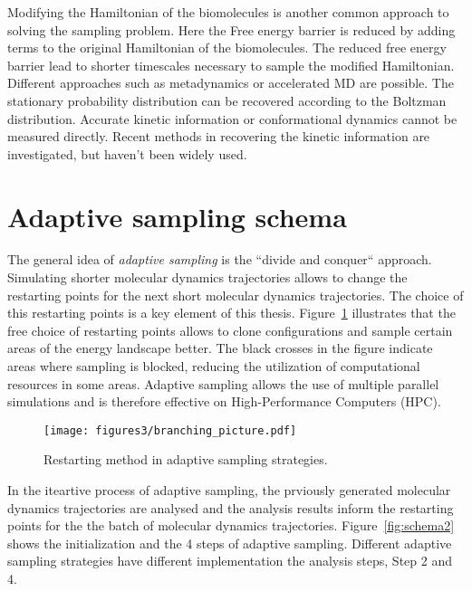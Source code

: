 Modifying the Hamiltonian of the biomolecules is another common approach to solving the sampling problem. Here the Free energy barrier is reduced by adding terms to the original Hamiltonian of the biomolecules.
The reduced free energy barrier lead to shorter timescales necessary to sample the modified Hamiltonian. Different approaches such as metadynamics \cite{laio2008metadynamics} or accelerated MD\cite{hamelberg2004accelerated} are possible. The stationary probability distribution can be recovered according to the Boltzman distribution. Accurate kinetic information or conformational dynamics cannot be measured directly. Recent methods in recovering the kinetic information\cite{pathreweight1, pathreweight2, pathreweight3, pathreweight4} are investigated, but haven't been widely used. 



\section{\label{sec:design}Adaptive sampling schema}


The general idea of \emph{adaptive sampling} \cite{singhal2005error, bowman2010enhanced,
weber2011characterization, Fabritiis-2014, preto2014fast, doerr2016htmd,
AdaptivePELE-Lecina2017, EvolutionCoupling-Shamsi2017, FAST-Bowman-2015, 
Strategies-erros-reduce, plattner2017complete, Adstrategies2018} is the ``divide and conquer`` approach. Simulating shorter molecular dynamics trajectories allows to change the restarting points for the next short molecular dynamics trajectories. The choice of this restarting points is a key element of this thesis. Figure~\ref{fig:branching} illustrates that the free choice of restarting points allows to clone configurations and sample certain areas of the energy landscape better. The black crosses in the figure indicate areas where sampling is blocked, reducing the utilization of computational resources in some areas.
Adaptive sampling allows the use of multiple parallel simulations and is therefore effective on High-Performance Computers (HPC).

\begin{figure}[h]
  \centering
  \texttt{[image: figures3/branching\_picture.pdf]}
  \caption{Restarting method in adaptive sampling strategies.}
  \label{fig:branching}
\end{figure}


In the iteartive process of adaptive sampling, the prviously generated molecular dynamics trajectories are analysed and the analysis results inform the restarting points for the the batch of
molecular dynamics trajectories. Figure~\ref{fig:schema2} shows the initialization and the 4 steps of adaptive sampling. Different adaptive sampling strategies have different implementation the analysis steps, Step 2 and 4. 


